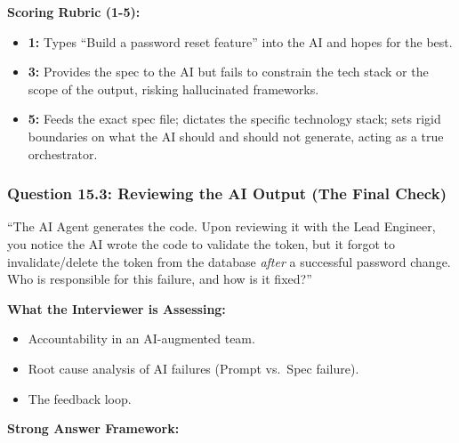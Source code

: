\textbf{Scoring Rubric (1-5):}

\begin{itemize}
\tightlist
\item
  \textbf{1:} Types ``Build a password reset feature'' into the AI and
  hopes for the best.
\item
  \textbf{3:} Provides the spec to the AI but fails to constrain the
  tech stack or the scope of the output, risking hallucinated
  frameworks.
\item
  \textbf{5:} Feeds the exact spec file; dictates the specific
  technology stack; sets rigid boundaries on what the AI should and
  should not generate, acting as a true orchestrator.
\end{itemize}

\subsubsection{Question 15.3: Reviewing the AI Output (The Final
Check)}\label{question-15.3-reviewing-the-ai-output-the-final-check}

``The AI Agent generates the code. Upon reviewing it with the Lead
Engineer, you notice the AI wrote the code to validate the token, but it
forgot to invalidate/delete the token from the database \emph{after} a
successful password change. Who is responsible for this failure, and how
is it fixed?''

\textbf{What the Interviewer is Assessing:}

\begin{itemize}
\tightlist
\item
  Accountability in an AI-augmented team.
\item
  Root cause analysis of AI failures (Prompt vs.~Spec failure).
\item
  The feedback loop.
\end{itemize}

\textbf{Strong Answer Framework:}

